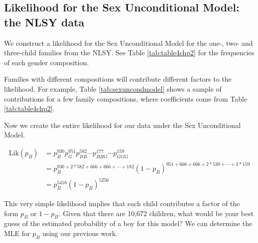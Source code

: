 \documentclass[
]{krantz}
\newcommand{\Lik}{\mathrm{Lik}}
\begin{document}
\hypertarget{likelihood-for-the-sex-unconditional-model-the-nlsy-data}{%
\subsection{Likelihood for the Sex Unconditional Model: the NLSY data}\label{likelihood-for-the-sex-unconditional-model-the-nlsy-data}}

We construct a likelihood for the Sex Unconditional Model for the one-, two- and three-child families from the NLSY. See Table \ref{tab:table4chp2} for the frequencies of each gender composition.

Families with different compositions will contribute different factors to the likelihood. For example, Table \ref{tab:sexuncondmodel} shows a sample of contributions for a few family compositions, where coefficients come from Table \ref{tab:table4chp2}.

\begin{table}

\caption{\label{tab:sexuncondmodel}Contributions to the likelihood function for the Sex Unconditional Model for a sample of family compositions from the NLSY data}
\centering
{}
\end{table}

Now we create the entire likelihood for our data under the Sex Unconditional Model.

\begin{align*}
 \Lik(p_B) &= p_B^{930}p_G^{951}p_{BB}^{582} \cdots p_{BBG}^{177} \cdots p_{GGG}^{159} \\
 &= p_B^{930+2*582+666+666+\cdots+182}(1-p_B)^{951+666+666+2*530+\cdots+3*159} \\
 &=  p_B^{5416}(1-p_B)^{5256}
\end{align*}

This very simple likelihood implies that each child contributes a factor of the form \(p_B\) or \(1-p_B\). Given that there are 10,672 children, what would be your best guess of the estimated probability of a boy for this model? We can determine the MLE for \(p_B\) using our previous work.
\end{document}
